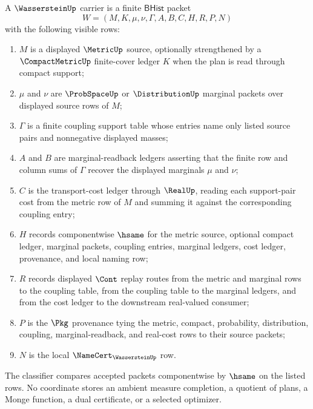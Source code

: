 \begin{definition}
\label{def:wasserstein-transport-plan-carrier}
A $\WassersteinUp$ carrier is a finite $\mathsf{BHist}$ packet
$$
W=(M,K,\mu,\nu,\Gamma,A,B,C,H,R,P,N)
$$
with the following visible rows:
\begin{enumerate}
\item $M$ is a displayed $\MetricUp$ source, optionally strengthened by a $\CompactMetricUp$ finite-cover ledger $K$ when the plan is read through compact support;
\item $\mu$ and $\nu$ are $\ProbSpaceUp$ or $\DistributionUp$ marginal packets over displayed source rows of $M$;
\item $\Gamma$ is a finite coupling support table whose entries name only listed source pairs and nonnegative displayed masses;
\item $A$ and $B$ are marginal-readback ledgers asserting that the finite row and column sums of $\Gamma$ recover the displayed marginals $\mu$ and $\nu$;
\item $C$ is the transport-cost ledger through $\RealUp$, reading each support-pair cost from the metric row of $M$ and summing it against the corresponding coupling entry;
\item $H$ records componentwise $\hsame$ for the metric source, optional compact ledger, marginal packets, coupling entries, marginal ledgers, cost ledger, provenance, and local naming row;
\item $R$ records displayed $\Cont$ replay routes from the metric and marginal rows to the coupling table, from the coupling table to the marginal ledgers, and from the cost ledger to the downstream real-valued consumer;
\item $P$ is the $\Pkg$ provenance tying the metric, compact, probability, distribution, coupling, marginal-readback, and real-cost rows to their source packets;
\item $N$ is the local $\NameCert_{\WassersteinUp}$ row.
\end{enumerate}
The classifier compares accepted packets componentwise by $\hsame$ on the listed rows. No coordinate stores an ambient measure completion, a quotient of plans, a Monge function, a dual certificate, or a selected optimizer.
\end{definition}

